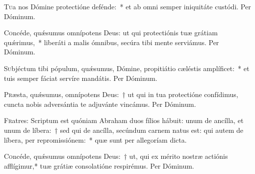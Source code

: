 \documentclass[vesperale_romanum.tex]{subfiles}
\begin{document}


\oratio

\lettrine{T}{u}a nos Dómine protectióne defénde:~* et ab omni semper iniquitáte custódi. Per Dóminum.



\oratio

\lettrine{C}{o}ncéde, quǽsumus omnípotens Deus: ut qui protectiónis tuæ grátiam quǽrimus,~* liberáti a malis ómnibus, secúra tibi mente serviámus. Per Dóminum.



\oratio

\lettrine{S}{u}bjéctum tibi pópulum, quǽsumus, Dómine, propitiátio cæléstis amplíficet:~* et tuis semper fáciat servíre mandátis. Per Dóminum.



\oratio

\lettrine{P}{r}æsta, quǽsumus, omnípotens Deus:~† ut qui in tua protectióne confídimus, cuncta nobis adversántia te adjuvánte vincámus. Per Dóminum.


\capitulum

\lettrine{F}{r}atres: Scriptum est quóniam Abraham duos fílios hábuit: unum de ancílla, et unum de líbera:~† sed qui de ancílla, secúndum carnem natus est: qui autem de líbera, per repromissiónem:~* quæ sunt per allegoríam dicta.




\oratio

\lettrine{C}{o}ncéde, quǽsumus omnípotens Deus:~† ut, qui ex mérito nostræ actiónis afflígimur,* tuæ grátiæ consolatióne respirémus.
Per Dóminum.

\end{document}

